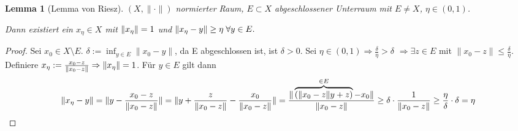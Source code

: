 \documentclass[ngerman]{report}
\theoremstyle{plain}%
\newtheorem{lemma}[thm]{Lemma}
\theoremstyle{definition}%
\theoremstyle{myStyle}
\newcommand{\norm}[1]{\|#1\|}
\newcommand{\df}[1][]{%
	\overset{#1}{\Rightarrow}
}
\begin{document}
	\begin{lemma}[Lemma von Riesz]%
		$(X,\norm{\cdot})$ normierter Raum, $E\subset X$ abgeschlossener Unterraum mit $E \not = X$, $\eta\in (0,1)$. \par
		Dann existiert ein $x_\eta \in X$ mit $\norm{\xt} = 1$ und $\norm{\xt - y} \geq \eta \; \forall y\in E.$
	\end{lemma}
	\begin{proof}
		Sei $x_0 \in X\setminus E$. $\delta := \inf_{y\in E} \norm{x_0 - y}$, da E abgeschlossen ist, ist $\delta > 0$. Sei $\eta \in (0,1) \df \frac{\delta}{\eta} > \delta $ $\df \exists z\in E$ mit $\norm{x_0 - z} \leq \frac{\delta}{\eta}.$ Definiere $\xt := \frac{x_0-z}{\norm{x_0 - z}} \df \norm{\xt} = 1$.
		Für $y\in E$ gilt dann 
		$$\norm{\xt - y} = \norm{y - \frac{x_0-z}{\norm{x_0 - z}}} 
		= \norm{y + \frac{z}{\norm{x_0 - z}} - \frac{x_0}{\norm{x_0 - z}}} 
		= \frac{\norm{\overbrace{(\norm{x_0 - z}y + z)}^{\in E} - x_0}}{\norm{x_0 - z}}  
		\geq \delta\cdot \frac{1}{\norm{x_0 - z}} \geq \frac{\eta}{\delta} \cdot \delta = \eta$$


	\end{proof}	
\end{document}
